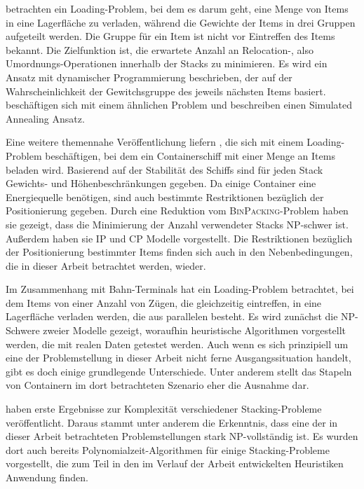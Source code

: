 \citet{Kim2000} betrachten ein Loading-Problem, bei dem es darum geht, eine Menge von Items in eine
Lagerfläche zu verladen, während die Gewichte der Items in drei Gruppen aufgeteilt werden.
Die Gruppe für ein Item ist nicht vor Eintreffen des Items bekannt. Die Zielfunktion ist, die erwartete Anzahl an Relocation-,
also Umordnungs-Operationen innerhalb der Stacks zu minimieren. Es wird ein Ansatz mit dynamischer Programmierung beschrieben,
der auf der Wahrscheinlichkeit der Gewitchsgruppe des jeweils nächsten Items basiert.
\citet{Kang2006} beschäftigen sich mit einem ähnlichen Problem und beschreiben einen Simulated Annealing Ansatz.

\pagebreak

Eine weitere themennahe Veröffentlichung liefern \citet{Delgado2012}, die sich mit einem
Loading-Problem beschäftigen, bei dem ein Containerschiff mit einer Menge an Items beladen wird.
Basierend auf der Stabilität des Schiffs sind für jeden Stack Gewichts- und Höhenbeschränkungen gegeben.
Da einige Container eine Energiequelle benötigen, sind auch bestimmte Restriktionen bezüglich der Positionierung gegeben.
Durch eine Reduktion vom \textsc{BinPacking}-Problem haben sie gezeigt, dass die Minimierung der Anzahl verwendeter Stacks NP-schwer ist.
Außerdem haben sie IP und CP Modelle vorgestellt.
Die Restriktionen bezüglich der Positionierung bestimmter Items finden sich auch in den Nebenbedingungen,
die in dieser Arbeit betrachtet werden, wieder.

Im Zusammenhang mit Bahn-Terminals hat \citet{Jaehn2013} ein Loading-Problem betrachtet,
bei dem Items von einer Anzahl von Zügen, die gleichzeitig eintreffen,
in eine Lagerfläche verladen werden, die aus parallelen  besteht. Es
wird zunächst die NP-Schwere zweier Modelle gezeigt, woraufhin heuristische Algorithmen vorgestellt werden,
die mit realen Daten getestet werden. Auch wenn es sich prinzipiell um eine der Problemstellung in dieser
Arbeit nicht ferne Ausgangssituation handelt, gibt es doch einige grundlegende Unterschiede.
Unter anderem stellt das Stapeln von Containern im dort betrachteten Szenario eher die Ausnahme dar.

\citet{Bruns2015} haben erste Ergebnisse zur Komplexität verschiedener Stacking-Probleme veröffentlicht.
Daraus stammt unter anderem die Erkenntnis, dass eine der in dieser Arbeit betrachteten Problemstellungen stark NP-vollständig ist.
Es wurden dort auch bereits Polynomialzeit-Algorithmen für einige Stacking-Probleme vorgestellt, die zum Teil
in den im Verlauf der Arbeit entwickelten Heuristiken Anwendung finden.

